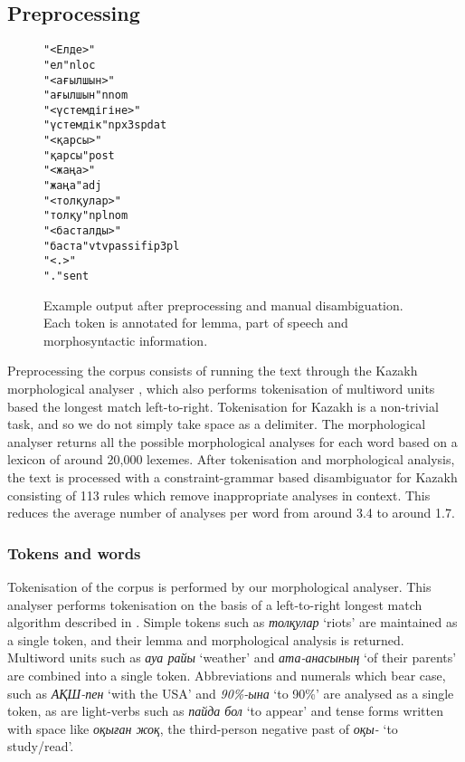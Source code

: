 \documentclass[a4paper,11pt, onecolumn,twoside]{article}
\newcommand{\kazakh}[1]{{\em #1}}
\newcommand{\gloss}[1]{`#1'}
\begin{document}
\subsection{Preprocessing}

\begin{figure}
\begin{tiny}
\begin{alltt}
"<Елде>"
        "ел" n loc
"<ағылшын>"
        "ағылшын" n nom
"<үстемдігіне>"
        "үстемдік" n px3sp dat
"<қарсы>"
        "қарсы" post
"<жаңа>"
        "жаңа" adj
"<толқулар>"
        "толқу" n pl nom
"<басталды>"
        "баста" v tv pass ifi p3 pl
"<.>"
        "." sent
\end{alltt}
\end{tiny}
\caption{Example output after preprocessing and manual disambiguation. Each token is annotated for lemma,
   part of speech and morphosyntactic information.}
\end{figure}

Preprocessing the corpus consists of running the text through the Kazakh morphological
analyser \parencite{Washington14}, which also performs tokenisation of multiword units based 
the longest match left-to-right. Tokenisation for Kazakh is a non-trivial task, and so
we do not simply take space as a delimiter. The morphological analyser returns all 
the possible morphological analyses for each word based on a lexicon of around 20,000 lexemes.
After tokenisation and morphological analysis, the text is processed with a constraint-grammar 
based disambiguator for Kazakh consisting of 113 rules which remove inappropriate 
analyses in context. This reduces the average number of analyses per word from around 3.4
to around 1.7.


\subsubsection{Tokens and words}

Tokenisation of the corpus is performed by our morphological analyser. This analyser
performs tokenisation on the basis of a left-to-right longest match algorithm described
in \textcite{garrido02}. Simple tokens such as \kazakh{толқулар} \gloss{riots} are maintained
as a single token, and their lemma and morphological analysis is returned. Multiword
units such as \kazakh{ауа райы} \gloss{weather} and \kazakh{ата-анасының} \gloss{of their parents} are combined
into a single token. Abbreviations and numerals which bear case, such as \kazakh{АҚШ-пен} \gloss{with the USA}
and \kazakh{90\%-ына} \gloss{to 90\%} are analysed as a single token, as are light-verbs such as
\kazakh{пайда бол} \gloss{to appear} and tense forms written with space like \kazakh{оқыған жоқ},
the third-person negative past of \kazakh{оқы-} \gloss{to study/read}.
\end{document}
